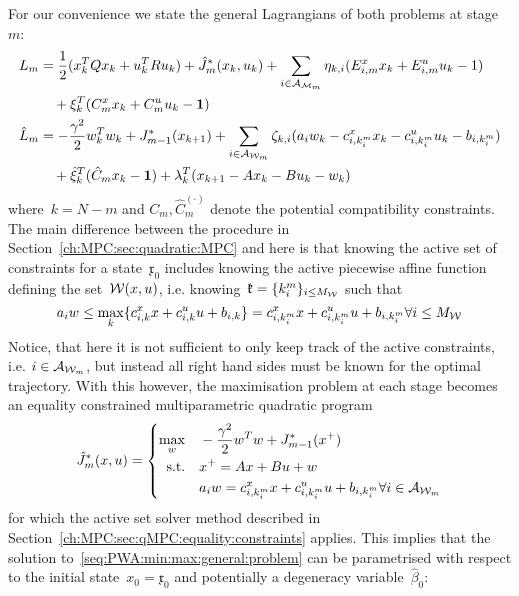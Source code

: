 %
For our convenience we state the general Lagrangians of both problems at stage~$m$:
%
\begin{equation}
	\begin{aligned}
	L_m &= \frac{1}{2} (x_k^TQx_k + u_k^TRu_k) + \hat J_m^\ast(x_k,u_k)+ \sum_{i\in\mathcal A_{\mathcal M_m}}\eta_{k,i}(E_{i,m}^x x_k+ E_{i,m}^u u_k - 1)\\&\quad + \xi_k^T(C_m^x x_k+ C_m^u u_k -\mathbf{1})\\
	\hat L_m &= -\frac{\gamma^2}{2}w_k^Tw_k + J_{m-1}^\ast(x_{k+1}) + \sum_{i\in\mathcal A_{\mathcal W_m}}\zeta_{k,i}(a_i w_k - c_{i,k^m_i}^x x_k- c_{i,k^m_i}^u u_k - b_{i,k^m_i})\\&\quad + \hat\xi_k^T(\hat C_m x_k - \mathbf{1}) + \lambda_{k}^T(x_{k+1}-Ax_k-Bu_k-w_k)
	\end{aligned}
\end{equation}
%
where~$k=N-m$ and $C_m,\hat C_m^{(\cdot)}$ denote the potential compatibility constraints.
%
\\[1em]
%
\mysplit The main difference between the procedure in Section~\ref{ch:MPC:sec:quadratic:MPC} and here is that knowing the active set of constraints for a state~$\mathfrak{x}_0$ includes knowing the active piecewise affine function defining the set~$\mathcal W(x,u)$, i.e. knowing~$\mathfrak{k} = \{k^m_i\}_{i\leq M_\mathcal W}$ such that 
%
\begin{equation}
	a_i w\leq \max_{k}\{c_{i,k}^x x+c_{i,k}^u u + b_{i,k}\} = c_{i,k^m_i}^x x+ c_{i,k^m_i}^u u + b_{i,k^m_i} \forall i\leq M_\mathcal W
\end{equation}
%
Notice, that here it is not sufficient to only keep track of the active constraints, i.e. $i\in\mathcal A_{\mathcal W_m}$, but instead all right hand sides must be known for the optimal trajectory.
%
With this however, the maximisation problem at each stage becomes an equality constrained multiparametric quadratic program
%
\begin{equation}
	\hat J_m^\ast(x,u) = \left\{\begin{aligned}\max_w&\quad -\frac{\gamma^2}{2}w^Tw + J_{m-1}^\ast(x^+)\\
	\text{s.t.}&\quad x^+=Ax+Bu+w \\
	&\quad a_iw = c_{i,k^m_i}^x x+ c_{i,k^m_i}^u u + b_{i,k^m_i} \forall i\in\mathcal A_{\mathcal W_m}
	\end{aligned}\right.
\end{equation}
%
for which the active set solver method described in Section~\ref{ch:MPC:sec:qMPC:equality:constraints} applies.
%
This implies that the solution to~\eqref{seq:PWA:min:max:general:problem} can be parametrised with respect to the initial state~$x_0=\mathfrak{x}_0$ and potentially a degeneracy variable~$\hat\beta_0$:
